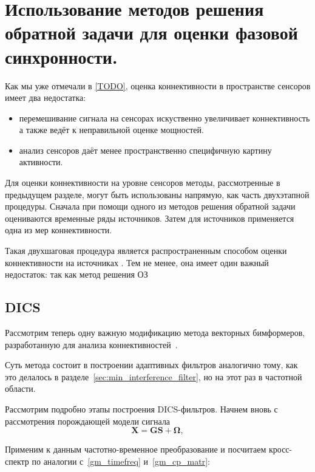 

\section{Использование методов решения обратной задачи для оценки фазовой синхронности.}
Как мы уже отмечали в \ref{TODO}, оценка коннективности в пространстве сенсоров
имеет два недостатка:
\begin{itemize}
    \item перемешивание сигнала на сенсорах искуственно увеличивает коннективность
        а также ведёт к неправильной оценке мощностей.
    \item анализ сенсоров даёт менее пространственно специфичную картину активности.
\end{itemize}

Для оценки коннективности на уровне сенсоров методы, рассмотренные в предыдущем разделе, могут быть использованы
напрямую, как часть двухэтапной процедуры. Сначала при помощи одного из методов решения обратной задачи
оцениваются временные ряды источников. Затем для источников применяется одна из мер коннективности.

Такая двухшаговая процедура является распространенным способом
оценки коннективности на источниках \cite{TODO:add some refs}. Тем не менее,
она имеет один важный недостаток: так как метод решения ОЗ


\subsection{DICS}
\label{DICS_subsection}
Рассмотрим теперь одну важную модификацию метода векторных бимформеров,
разработанную для анализа коннективностей~\cite{DICS}.

Суть метода состоит в построении адаптивных фильтров аналогично тому, как это делалось 
в разделе~\ref{sec:min_interference_filter}, но на этот раз в частотной области.

Рассмотрим подробно этапы построения DICS-фильтров.
Начнем вновь с рассмотрения порождающей модели сигнала
\begin{equation}
    \mathbf{X} = \mathbf{G} \mathbf{S} + \mathbf{\Omega},
    \label{gm_dics}
\end{equation}


Применим к данным частотно-временное преобразование и посчитаем кросс-спектр по аналогии
с~\ref{gm_timefreq} и~\ref{gm_cp_matr}:

